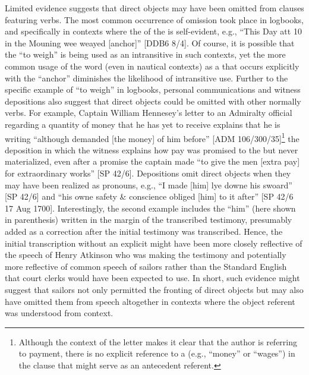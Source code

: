 Limited evidence suggests that direct objects may have been omitted from clauses featuring  verbs. The most common occurrence of  omission took place in logbooks, and specifically in contexts where the  of the  is self-evident, e.g., “This Day att 10 in the Mouning wee weayed [anchor]” [DDB6 8/4]. Of course, it is possible that the  “to weigh” is being used as an intransitive  in such contexts, yet the more common usage of the word (even in nautical contexts) as a  that occurs explicitly with the  “anchor” diminishes the likelihood of intransitive use. Further to the specific example of “to weigh” in logbooks, personal communications and witness depositions also suggest that direct objects could be omitted with other normally  verbs. For example, Captain William Hennesey’s letter to an Admiralty official regarding a quantity of money that he has yet to receive explains that he is writing “although demanded [the money] of him before” [ADM 106/300/35]\footnote{Although the context of the letter makes it clear that the author is referring to payment, there is no explicit reference to a  (e.g., “money” or “wages”) in the clause that might serve as an antecedent referent.}  the deposition in which the witness explains how pay was promised to the  but never materialized, even after a promise the captain made “to give the men [extra pay] for extraordinary works” [SP 42/6]. Depositions omit direct objects when they may have been realized as pronouns, e.g., “I made [him] lye downe his swoard” [SP 42/6] and “his owne safety \& conscience obliged [him] to it after” [SP 42/6 17 Aug {1700}]. Interestingly, the second example includes the  “him” (here shown in parenthesis) written in the margin of the transcribed testimony, presumably added as a correction after the initial testimony was transcribed. Hence, the initial transcription without an explicit  might have been more closely reflective of the speech of Henry Atkinson who was making the testimony and potentially more reflective of common speech of sailors rather than the Standard English that court clerks would have been expected to use. In short, such evidence might suggest that sailors not only permitted the fronting of direct objects but may also have omitted them from speech altogether in contexts where the object referent was understood from context.  

